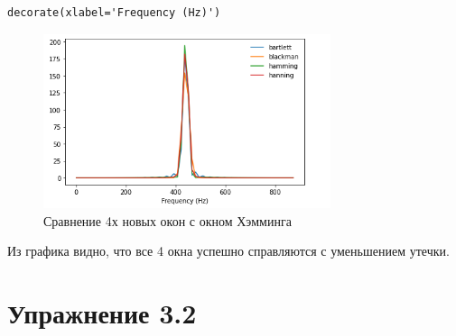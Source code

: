 \documentclass[a4paper,12pt]{article}
\begin{document}
\begin{enumerate}
\begin{lstlisting}[caption=Создание 4х новых окон]
			decorate(xlabel='Frequency (Hz)')
		\end{lstlisting}
		\begin{figure}[H]
			\centering
			\includegraphics[width=0.75\textwidth]{1_2.png}
			\caption{Сравнение 4х новых окон с окном Хэмминга}
			\label{fig:1.2}
		\end{figure}
		Из графика видно, что все 4 окна успешно справляются с уменьшением утечки.
		
	\end{enumerate}
	
	\newpage
	
	\section{Упражнение 3.2}
	
\end{document}
